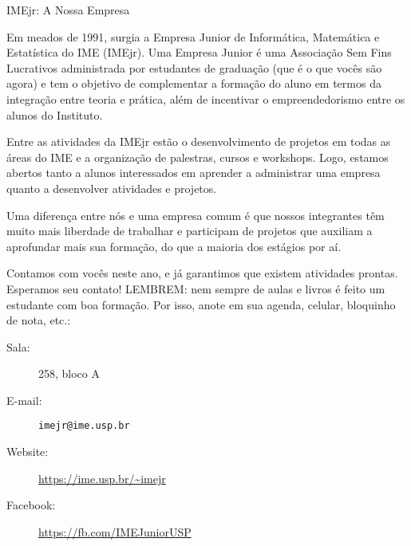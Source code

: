 \begin{subsecao}{IMEjr: A Nossa Empresa}


Em meados de 1991, surgia a Empresa Junior de Informática, Matemática e
Estatística do IME (IMEjr). Uma Empresa Junior é uma Associação Sem Fins
Lucrativos administrada por estudantes de graduação (que é o que vocês são
agora) e tem o objetivo de complementar a formação do aluno em termos da
integração entre teoria e prática, além de incentivar o empreendedorismo entre
os alunos do Instituto.

Entre as atividades da IMEjr estão o desenvolvimento de projetos em todas as
áreas do IME e a organização de palestras, cursos e workshops. Logo, estamos
abertos tanto a alunos interessados em aprender a administrar uma empresa
quanto a desenvolver atividades e projetos.

Uma diferença entre nós e uma empresa comum é que nossos integrantes têm muito
mais liberdade de trabalhar e participam de projetos que auxiliam a aprofundar
mais sua formação, do que a maioria dos estágios por aí.

Contamos com vocês neste ano, e já garantimos que existem atividades prontas.
Esperamos seu contato! LEMBREM: nem sempre de aulas e livros é feito um
estudante com boa formação. Por isso, anote em sua agenda, celular, bloquinho
de nota, etc.:

\begin{description}
\item [Sala:] 258, bloco A
\item[E-mail:] \texttt{imejr@ime.usp.br}
\item[Website:] \url{https://ime.usp.br/~imejr}
\item[Facebook:] \url{https://fb.com/IMEJuniorUSP}
\end{description}

\end{subsecao}
